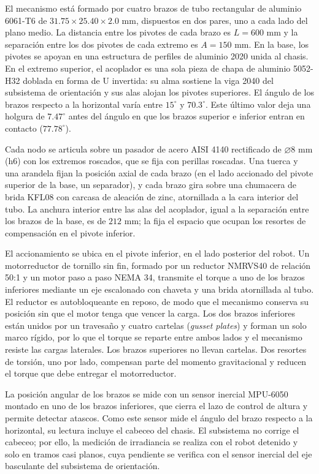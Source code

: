 \documentclass[../../General.tex]{subfiles}
\begin{document}
El mecanismo está formado por cuatro brazos de tubo rectangular de aluminio 6061-T6 de $31.75 \times 25.40 \times 2.0\text{ mm}$, dispuestos en dos pares, uno a cada lado del plano medio. La distancia entre los pivotes de cada brazo es $L = 600\text{ mm}$ y la separación entre los dos pivotes de cada extremo es $A = 150\text{ mm}$. En la base, los pivotes se apoyan en una estructura de perfiles de aluminio 2020 unida al chasis. En el extremo superior, el acoplador es una sola pieza de chapa de aluminio 5052-H32 doblada en forma de U invertida: su alma sostiene la viga 2040 del subsistema de orientación y sus alas alojan los pivotes superiores. El ángulo de los brazos respecto a la horizontal varía entre $15^\circ$ y $70.3^\circ$. Este último valor deja una holgura de $7.47^\circ$ antes del ángulo en que los brazos superior e inferior entran en contacto ($77.78^\circ$).

Cada nodo se articula sobre un pasador de acero AISI 4140 rectificado de $\varnothing 8\text{ mm}$ (h6) con los extremos roscados, que se fija con perillas roscadas. Una tuerca y una arandela fijan la posición axial de cada brazo (en el lado accionado del pivote superior de la base, un separador), y cada brazo gira sobre una chumacera de brida KFL08 con carcasa de aleación de zinc, atornillada a la cara interior del tubo. La anchura interior entre las alas del acoplador, igual a la separación entre los brazos de la base, es de $212\text{ mm}$; la fija el espacio que ocupan los resortes de compensación en el pivote inferior.

El accionamiento se ubica en el pivote inferior, en el lado posterior del robot. Un motorreductor de tornillo sin fin, formado por un reductor NMRVS40 de relación 50:1 y un motor paso a paso NEMA 34, transmite el torque a uno de los brazos inferiores mediante un eje escalonado con chaveta y una brida atornillada al tubo. El reductor es autobloqueante en reposo, de modo que el mecanismo conserva su posición sin que el motor tenga que vencer la carga. Los dos brazos inferiores están unidos por un travesaño y cuatro cartelas (\textit{gusset plates}) y forman un solo marco rígido, por lo que el torque se reparte entre ambos lados y el mecanismo resiste las cargas laterales. Los brazos superiores no llevan cartelas. Dos resortes de torsión, uno por lado, compensan parte del momento gravitacional y reducen el torque que debe entregar el motorreductor.

La posición angular de los brazos se mide con un sensor inercial MPU-6050 montado en uno de los brazos inferiores, que cierra el lazo de control de altura y permite detectar atascos. Como este sensor mide el ángulo del brazo respecto a la horizontal, su lectura incluye el cabeceo del chasis. El subsistema no corrige el cabeceo; por ello, la medición de irradiancia se realiza con el robot detenido y solo en tramos casi planos, cuya pendiente se verifica con el sensor inercial del eje basculante del subsistema de orientación.
\end{document}

